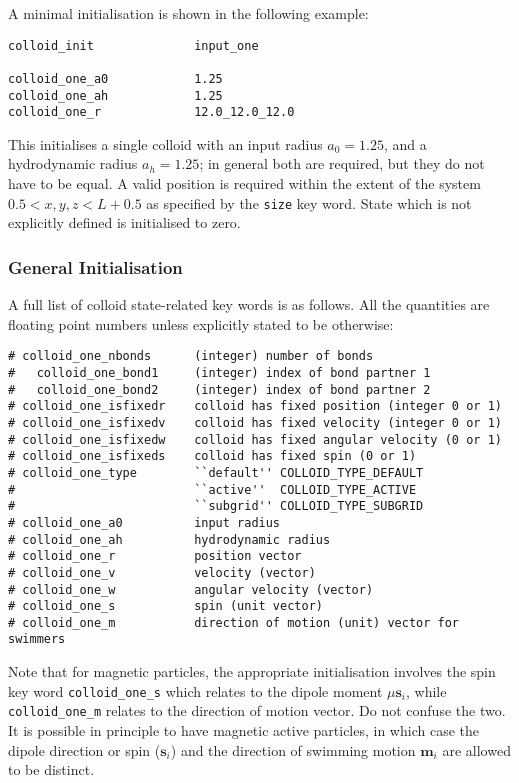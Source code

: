 A minimal initialisation is shown in the following example:
\begin{lstlisting}
colloid_init              input_one

colloid_one_a0            1.25
colloid_one_ah            1.25
colloid_one_r             12.0_12.0_12.0
\end{lstlisting}
This initialises a single colloid with an input radius $a_0=1.25$,
and a hydrodynamic radius $a_h=1.25$; in general both are required,
but they do not have to be equal.
A valid position is required within the extent of the system
$0.5 < x,y,z < L + 0.5$ as specified by the \texttt{size} key word.
State which is not explicitly defined is initialised to zero.

\subsubsection{General Initialisation}

A full list of colloid state-related key words is as follows. All
the quantities are floating point numbers unless explicitly stated
to be otherwise:
\begin{lstlisting}
# colloid_one_nbonds      (integer) number of bonds
#   colloid_one_bond1     (integer) index of bond partner 1
#   colloid_one_bond2     (integer) index of bond partner 2
# colloid_one_isfixedr    colloid has fixed position (integer 0 or 1)
# colloid_one_isfixedv    colloid has fixed velocity (integer 0 or 1)
# colloid_one_isfixedw    colloid has fixed angular velocity (0 or 1)
# colloid_one_isfixeds    colloid has fixed spin (0 or 1)
# colloid_one_type        ``default'' COLLOID_TYPE_DEFAULT
#                         ``active''  COLLOID_TYPE_ACTIVE
#                         ``subgrid'' COLLOID_TYPE_SUBGRID
# colloid_one_a0          input radius
# colloid_one_ah          hydrodynamic radius
# colloid_one_r           position vector
# colloid_one_v           velocity (vector)
# colloid_one_w           angular velocity (vector)
# colloid_one_s           spin (unit vector)
# colloid_one_m           direction of motion (unit) vector for swimmers 
\end{lstlisting}

Note that for magnetic particles, the appropriate initialisation involves
the spin key word \texttt{colloid\_one\_s} which relates to the dipole
moment $\mu \mathbf{s}_i$, while \texttt{colloid\_one\_m} relates to the
direction of motion vector. Do not confuse the two.
It is possible in principle to have magnetic active particles,
in which case the dipole direction or spin ($\mathbf{s}_i$) and the
direction of swimming motion $\mathbf{m}_i$ are allowed to be distinct. 

